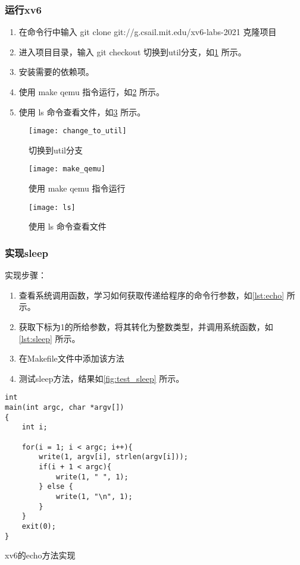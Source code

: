\subsubsection{运行xv6}

\begin{enumerate}
	\item 在命令行中输入 git clone git://g.csail.mit.edu/xv6-labs-2021 克隆项目
	\item 进入项目目录，输入 git checkout 切换到util分支，如\cref{fig:change_to_util} 所示。
	\item 安装需要的依赖项。
	\item 使用 make qemu 指令运行，如\cref{fig:make_qemu} 所示。
	\item 使用 ls 命令查看文件，如\cref{fig:ls} 所示。
\end{enumerate}

\begin{figure}[!htb]
	\centering
	\texttt{[image: change\_to\_util]}
	\caption{切换到util分支}
	\label{fig:change_to_util}
\end{figure}

\begin{figure}[!htb]
	\centering
	\texttt{[image: make\_qemu]}
	\caption{使用 make qemu 指令运行}
	\label{fig:make_qemu}
\end{figure}

\begin{figure}[!htb]
	\centering
	\texttt{[image: ls]}
	\caption{使用 ls 命令查看文件}
	\label{fig:ls}
\end{figure}

\subsubsection{实现sleep}

实现步骤：
\begin{enumerate}
	\item 查看系统调用函数，学习如何获取传递给程序的命令行参数，如\cref{lst:echo} 所示。
	\item 获取下标为1的所给参数，将其转化为整数类型，并调用系统函数，如\cref{lst:sleep} 所示。
	\item 在Makefile文件中添加该方法
	\item 测试sleep方法，结果如\cref{fig:test_sleep} 所示。
\end{enumerate}

\begin{listing}[!htb]
	\begin{verbatim}
int
main(int argc, char *argv[])
{
    int i;

    for(i = 1; i < argc; i++){
        write(1, argv[i], strlen(argv[i]));
        if(i + 1 < argc){
            write(1, " ", 1);
        } else {
            write(1, "\n", 1);
        }
    }
    exit(0);
}
	\end{verbatim}
	\caption{xv6的echo方法实现}\label{lst:echo}
\end{listing}

